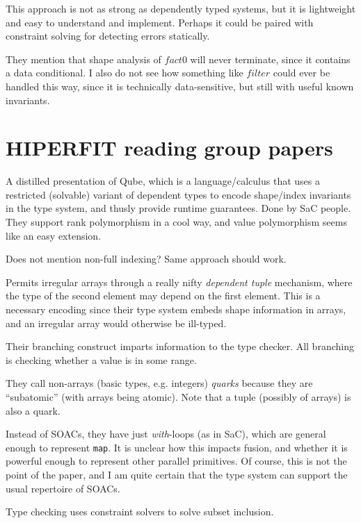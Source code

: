 \documentclass[a4paper, oneside, final]{memoir}
\begin{document}
This approach is not as strong as dependently typed systems, but it is
lightweight and easy to understand and implement.  Perhaps it could be
paired with constraint solving for detecting errors statically.

They mention that shape analysis of $fact 0$ will never terminate,
since it contains a data conditional.  I also do not see how something
like $filter$ could ever be handled this way, since it is technically
data-sensitive, but still with useful known invariants.

\section*{HIPERFIT reading group papers}

\begin{quote}
\end{quote}

A distilled presentation of Qube, which is a language/calculus that
uses a restricted (solvable) variant of dependent types to encode
shape/index invariants in the type system, and thusly provide runtime
guarantees.  Done by SaC people.  They support rank polymorphism in a
cool way, and value polymorphism seems like an easy extension.

Does not mention non-full indexing?  Same approach should work.

Permits irregular arrays through a really nifty \textit{dependent
  tuple} mechanism, where the type of the second element may depend on
the first element.  This is a necessary encoding since their type
system embeds shape information in arrays, and an irregular array
would otherwise be ill-typed.

Their branching construct imparts information to the type checker.
All branching is checking whether a value is in some range.

They call non-arrays (basic types, e.g. integers) \textit{quarks}
because they are ``subatomic'' (with arrays being atomic).  Note that
a tuple (possibly of arrays) is also a quark.

Instead of SOACs, they have just \textit{with}-loops (as in SaC),
which are general enough to represent \texttt{map}.  It is unclear how
this impacts fusion, and whether it is powerful enough to represent
other parallel primitives.  Of course, this is not the point of the
paper, and I am quite certain that the type system can support the
usual repertoire of SOACs.

Type checking uses constraint solvers to solve subset inclusion.
\end{document}
